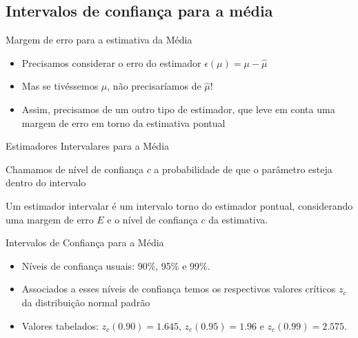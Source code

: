 \documentclass{beamer}
\begin{document}
\subsection{Intervalos de confiança para a média}
\begin{frame}{Margem de erro para a estimativa da Média}
  \begin{itemize}
  \item Precisamos considerar o erro do estimador $\epsilon(\mu) =
    \mu - \hat{\mu}$
  \item Mas se tivéssemos $\mu$, não precisaríamos de $\hat{\mu}$!
  \item Assim, precisamos de um outro tipo de estimador, que leve em
    conta uma margem de erro em torno da estimativa pontual
  \end{itemize}
\end{frame}

\begin{frame}{Estimadores Intervalares para a Média}
  \begin{definition}
    Chamamos de \alert{nível de confiança} $c$ a probabilidade de que
    o parâmetro esteja dentro do intervalo
  \end{definition}
  \begin{definition}
    Um \alert{estimador intervalar} é um intervalo torno do estimador
    pontual, considerando uma \alert{margem de erro} $E$ e o nível de
    confiança $c$ da estimativa.
  \end{definition}
\end{frame}

\begin{frame}{Intervalos de Confiança para a Média}
  \begin{itemize}
  \item Níveis de confiança usuais: 90\%, 95\% e 99\%.
  \item Associados a esses níveis de confiança temos os respectivos
    valores críticos $z_c$ da distribuição normal padrão
  \item Valores tabelados: $z_c(0.90) = 1.645$, $z_c(0.95)=1.96$ e
    $z_c(0.99)=2.575$.
  \end{itemize}
\end{frame}

\end{document}
